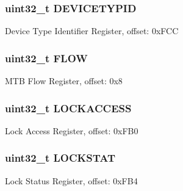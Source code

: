 \subsubsection[{D\+E\+V\+I\+C\+E\+T\+Y\+P\+I\+D}]{\setlength{\rightskip}{0pt plus 5cm}uint32\+\_\+t D\+E\+V\+I\+C\+E\+T\+Y\+P\+I\+D}\label{struct_m_t_b___mem_map_aa736d6fbfbc7e051f6a2caadd4f17b8f}
Device Type Identifier Register, offset\+: 0x\+F\+C\+C \hypertarget{struct_m_t_b___mem_map_a9c9250c96bf782415786243a9e7515a3}{}
\subsubsection[{F\+L\+O\+W}]{\setlength{\rightskip}{0pt plus 5cm}uint32\+\_\+t F\+L\+O\+W}\label{struct_m_t_b___mem_map_a9c9250c96bf782415786243a9e7515a3}
M\+T\+B Flow Register, offset\+: 0x8 \hypertarget{struct_m_t_b___mem_map_a85ddf0cc839ca195bad64336b6a86123}{}
\subsubsection[{L\+O\+C\+K\+A\+C\+C\+E\+S\+S}]{\setlength{\rightskip}{0pt plus 5cm}uint32\+\_\+t L\+O\+C\+K\+A\+C\+C\+E\+S\+S}\label{struct_m_t_b___mem_map_a85ddf0cc839ca195bad64336b6a86123}
Lock Access Register, offset\+: 0x\+F\+B0 \hypertarget{struct_m_t_b___mem_map_abae92c7b40f7130c62cdb81241fdd0e1}{}
\subsubsection[{L\+O\+C\+K\+S\+T\+A\+T}]{\setlength{\rightskip}{0pt plus 5cm}uint32\+\_\+t L\+O\+C\+K\+S\+T\+A\+T}\label{struct_m_t_b___mem_map_abae92c7b40f7130c62cdb81241fdd0e1}
Lock Status Register, offset\+: 0x\+F\+B4 \hypertarget{struct_m_t_b___mem_map_aa18cd97b47bac5b1af2e21151a28fce1}{}
